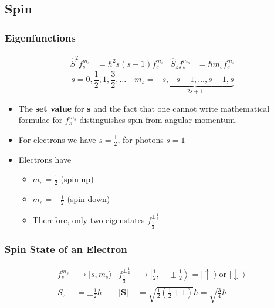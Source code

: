 \subsection{Spin}
\subsubsection{Eigenfunctions}

\noindent\begin{align*}
    \widehat{S}^2f_{s}^{m_s}   & =\hbar^{2}s (s+1) f_{s}^{m_s} &
    \widehat{S}_{z}f_{s}^{m_s} & =\hbar m_s f_{s}^{m_s}
\end{align*}
\begin{equation*}
    s =0,\frac{1}{2},1,\frac{3}{2},\dots \quad m_s =\underbrace{-s, -s+1,\dots, s-1, s}_{2s+1}
\end{equation*}

\begin{itemize}
    \item The \textbf{set value} for $\mathbf{s}$ and the fact that one cannot write mathematical formulae for $f_{s}^{m_s}$ distinguishes spin from angular momentum.
    \item For electrons we have $s=\frac{1}{2}$, for photons $s=1$
    \item Electrons have
          \begin{itemize}
              \item $m_s=\frac{1}{2}$ (spin up)
              \item $m_s=-\frac{1}{2}$ (spin down)
              \item Therefore, only two eigenstates $f_{\frac{1}{2}}^{\pm \frac{1}{2}}$
          \end{itemize}
\end{itemize}

\subsubsection{Spin State of an Electron}
\noindent\begin{align*}
    f_{s}^{m_{s}}                    & \rightarrow|s,m_{s}\rangle                                                                                         &
    f_{\frac{1}{2}}^{\pm\frac{1}{2}} & \rightarrow\left|\frac{1}{2},\quad \pm\frac{1}{2}\right>= \left|\uparrow\right> \text{or } \left|\downarrow\right>   \\
    S_z                              & =\pm \frac{1}{2}\hbar                                                                                              &
    |\mathbf{S}|                     & =\sqrt{\frac{1}{2}\left(\frac{1}{2}+1\right)}\hbar=\sqrt{\frac{3}{4}}\hbar
\end{align*}

